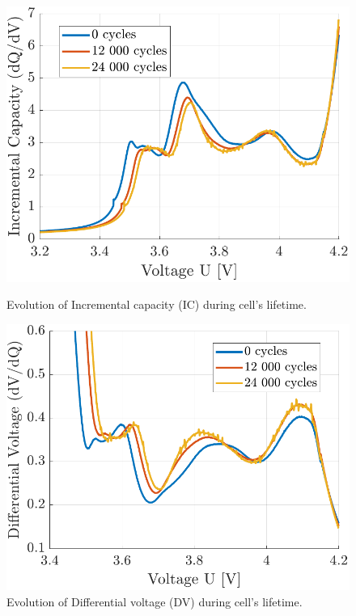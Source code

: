 \begin{figure}[b]
\centering
\begin{minipage}{0.49\textwidth}
    \centering
    \includegraphics[width=\textwidth]{figures/14/IC.pdf}
    \caption{Evolution of Incremental capacity (IC) during cell's lifetime.}
    \label{fig:14-IC}
\end{minipage}
\hfill
\begin{minipage}{0.49\textwidth}
    \centering
    \includegraphics[width=\textwidth]{figures/14/DV.pdf}
    \caption{Evolution of Differential voltage (DV) during cell's lifetime.}
    \label{fig:14-DV}
\end{minipage}
\end{figure}

